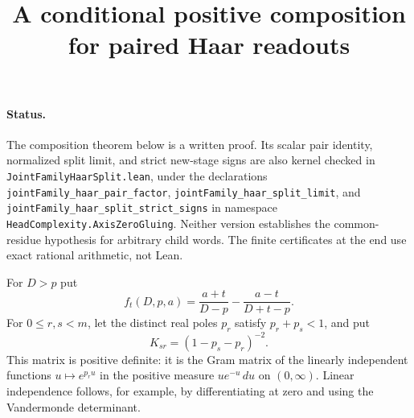 \documentclass{article}
\begin{document}
\title{A conditional positive composition for paired Haar readouts}
\maketitle

\paragraph{Status.}
The composition theorem below is a written proof. Its scalar pair
identity, normalized split limit, and strict new-stage signs are also
kernel checked in \texttt{JointFamilyHaarSplit.lean}, under the declarations
\texttt{jointFamily\_haar\_pair\_factor},
\texttt{jointFamily\_haar\_split\_limit}, and
\texttt{jointFamily\_haar\_split\_strict\_signs} in namespace
\texttt{HeadComplexity.AxisZeroGluing}.
Neither version establishes the common-residue hypothesis for arbitrary
child words. The finite certificates at the end use exact rational
arithmetic, not Lean.

For $D>p$ put
\[
 f_t(D,p,a)=\frac{a+t}{D-p}-\frac{a-t}{D+t-p}.
\]
For $0\leq r,s<m$, let the distinct real poles $p_r$ satisfy
$p_r+p_s<1$, and put
\[
 K_{sr}=(1-p_s-p_r)^{-2}.
\]
This matrix is positive definite: it is the Gram matrix of the linearly
independent functions $u\mapsto e^{p_ru}$ in the positive measure
$u e^{-u}\,du$ on $(0,\infty)$. Linear independence follows, for example,
by differentiating at zero and using the Vandermonde determinant.
\end{document}
